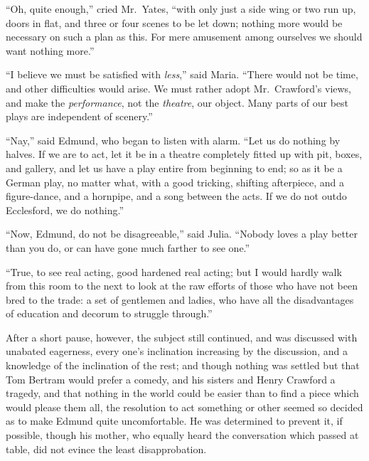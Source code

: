 ``Oh, quite enough,'' cried Mr.\ Yates, ``with only just a side wing
or two run up, doors in flat, and three or four scenes to be
let down; nothing more would be necessary on such a plan as this.
For mere amusement among ourselves we should want nothing more.''

``I believe we must be satisfied with \emph{less},'' said Maria.
``There would not be time, and other difficulties
would arise.  We must rather adopt Mr.\ Crawford's views,
and make the \emph{performance}, not the \emph{theatre}, our object.
Many parts of our best plays are independent of scenery.''

``Nay,'' said Edmund, who began to listen with alarm.
``Let us do nothing by halves.  If we are to act, let it be in
a theatre completely fitted up with pit, boxes, and gallery,
and let us have a play entire from beginning to end; so as it
be a German play, no matter what, with a good tricking,
shifting afterpiece, and a figure-dance, and a hornpipe,
and a song between the acts.  If we do not outdo Ecclesford,
we do nothing.''

``Now, Edmund, do not be disagreeable,'' said Julia.
``Nobody loves a play better than you do, or can have gone
much farther to see one.''

``True, to see real acting, good hardened real acting;
but I would hardly walk from this room to the next to
look at the raw efforts of those who have not been
bred to the trade:  a set of gentlemen and ladies,
who have all the disadvantages of education and decorum
to struggle through.''

After a short pause, however, the subject still continued,
and was discussed with unabated eagerness, every one's
inclination increasing by the discussion, and a knowledge
of the inclination of the rest; and though nothing was settled
but that Tom Bertram would prefer a comedy, and his sisters
and Henry Crawford a tragedy, and that nothing in the world
could be easier than to find a piece which would please
them all, the resolution to act something or other seemed
so decided as to make Edmund quite uncomfortable.  He was
determined to prevent it, if possible, though his mother,
who equally heard the conversation which passed at table,
did not evince the least disapprobation.

